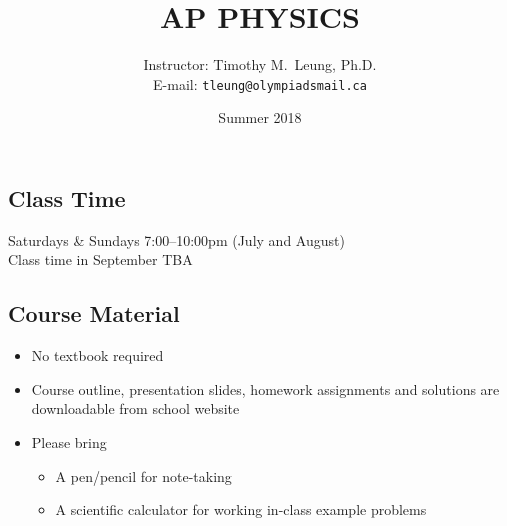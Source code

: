 \documentclass[11pt]{article}
\title{\vspace{-0.2in}\textbf{AP PHYSICS}}
\author{Instructor: Timothy M.\ Leung, Ph.D.\\
  E-mail: \texttt{tleung@olympiadsmail.ca}}
\date{Summer 2018}
\begin{document}
\maketitle

\subsection*{Class Time}
Saturdays \& Sundays 7:00--10:00pm (July and August)\\
Class time in September TBA


\subsection*{Course Material}
\begin{itemize}[itemsep=.1em,leftmargin=12pt] %
\item No textbook required
\item Course outline, presentation slides, homework assignments and solutions
  are downloadable from school website
\item Please bring
  \begin{itemize}[noitemsep,topsep=0pt]
  \item A pen/pencil for note-taking
  \item A scientific calculator for working in-class example problems
  \end{itemize}
\end{itemize}
\end{document}
